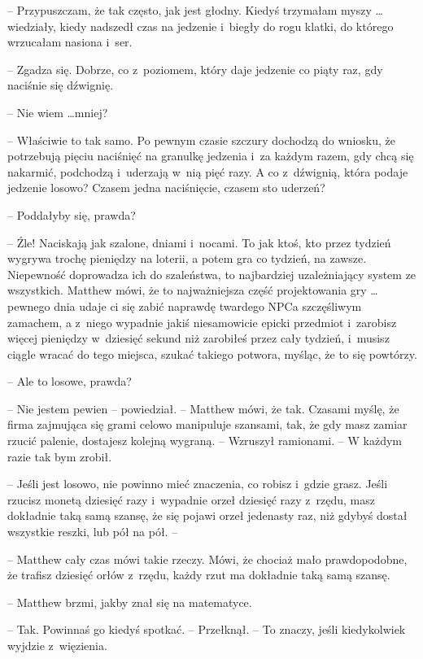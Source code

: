 \documentclass[oneside,polish,11pt,rmheadings]{mwbk}
\begin{document}
-- Przypuszczam, że tak często, jak jest głodny. Kiedyś trzymałam myszy  \ldots  wiedziały, kiedy nadszedł czas na jedzenie i~biegły do rogu klatki, do którego wrzucałam nasiona i~ser.

-- Zgadza się. Dobrze, co z~poziomem, który daje jedzenie co piąty raz, gdy naciśnie się dźwignię.

-- Nie wiem \ldots  mniej?

-- Właściwie to tak samo. Po pewnym czasie szczury dochodzą do wniosku, że potrzebują pięciu naciśnięć na granulkę jedzenia i~za każdym razem, gdy chcą się nakarmić, podchodzą i~uderzają w~nią pięć razy. A co z~dźwignią, która podaje jedzenie losowo? Czasem jedna naciśnięcie, czasem sto uderzeń? 

-- Poddałyby się, prawda?

-- Źle! Naciskają jak szalone, dniami i~nocami. To jak ktoś, kto przez tydzień wygrywa trochę pieniędzy na loterii, a potem gra co tydzień, na zawsze. Niepewność doprowadza ich do szaleństwa, to najbardziej uzależniający system ze wszystkich. Matthew mówi, że to najważniejsza część projektowania gry  \ldots  pewnego dnia udaje ci się zabić naprawdę twardego NPCa szczęśliwym zamachem, a z~niego wypadnie jakiś niesamowicie epicki przedmiot i~zarobisz więcej pieniędzy w~dziesięć sekund niż zarobiłeś przez cały tydzień, i~musisz ciągle wracać do tego miejsca, szukać takiego potwora, myśląc, że to się powtórzy.

-- Ale to losowe, prawda?

-- Nie jestem pewien -- powiedział. -- Matthew mówi, że tak. Czasami myślę, że firma zajmująca się grami celowo manipuluje szansami, tak, że gdy masz zamiar rzucić palenie, dostajesz kolejną wygraną. -- Wzruszył ramionami. -- W każdym razie tak bym zrobił.

-- Jeśli jest losowo, nie powinno mieć znaczenia, co robisz i~gdzie grasz. Jeśli rzucisz monetą dziesięć razy i~wypadnie orzeł dziesięć razy z~rzędu, masz dokładnie taką samą szansę, że się pojawi orzeł jedenasty raz, niż gdybyś dostał wszystkie reszki, lub pół na pół. -- 

-- Matthew cały czas mówi takie rzeczy. Mówi, że chociaż mało prawdopodobne, że trafisz dziesięć orłów z~rzędu, każdy rzut ma dokładnie taką samą szansę.

-- Matthew brzmi, jakby znał się na matematyce.

-- Tak. Powinnaś go kiedyś spotkać. -- Przełknął. -- To znaczy, jeśli kiedykolwiek wyjdzie z~więzienia.
\end{document}
